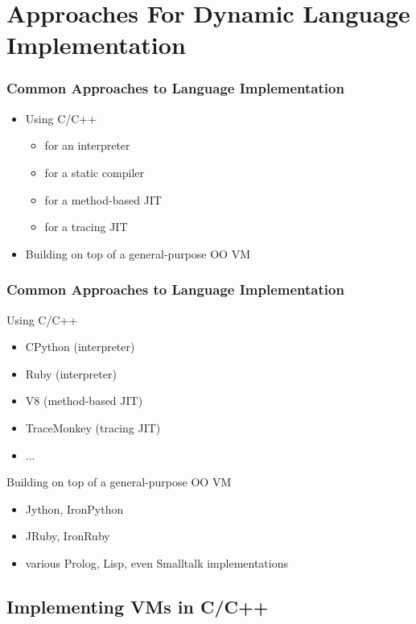\documentclass[utf8x]{beamer}
\begin{document}
\section{Approaches For Dynamic Language Implementation}

\begin{frame}
  \frametitle{Common Approaches to Language Implementation}
  \begin{itemize}
    \item Using C/C++
    \begin{itemize}
      \item for an interpreter
      \item for a static compiler
      \item for a method-based JIT
      \item for a tracing JIT
    \end{itemize}
    \item Building on top of a general-purpose OO VM
  \end{itemize}
\end{frame}

\begin{frame}
  \frametitle{Common Approaches to Language Implementation}
  \begin{block}{
    Using C/C++}
    \begin{itemize}
    \item CPython (interpreter)
    \item Ruby (interpreter)
    \item V8 (method-based JIT)
    \item TraceMonkey (tracing JIT)
    \item ...
    \end{itemize}
  \end{block}
  \pause
  \begin{block}{Building on top of a general-purpose OO VM}
    \begin{itemize}
    \item Jython, IronPython
    \item JRuby, IronRuby
    \item various Prolog, Lisp, even Smalltalk implementations
    \end{itemize}
  \end{block}
\end{frame}

\subsection{Implementing VMs in C/C++}
\end{document}
